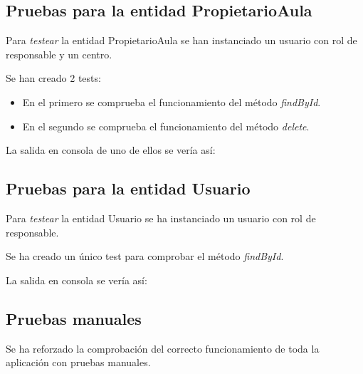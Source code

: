 \subsection{Pruebas para la entidad PropietarioAula}
Para \textit{testear} la entidad PropietarioAula se han instanciado un usuario con rol de responsable y un centro.

Se han creado 2 tests:
\begin{itemize}
    \item En el primero se comprueba el funcionamiento del método \textit{findById}.
    \item En el segundo se comprueba el funcionamiento del método \textit{delete}.
\end{itemize}


La salida en consola de uno de ellos se vería así:


\subsection{Pruebas para la entidad Usuario}
Para \textit{testear} la entidad Usuario se ha instanciado un usuario con rol de responsable.

Se ha creado un único test para comprobar el método \textit{findById}.


La salida en consola se vería así:


\subsection{Pruebas manuales}
Se ha reforzado la comprobación del correcto funcionamiento de toda la aplicación con pruebas manuales.

